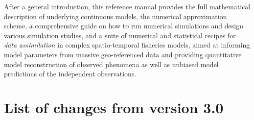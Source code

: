 \documentclass[a4paper,12pt,twoside]{book}
\begin{document}
After a general introduction, this reference manual provides the full mathematical description of underlying continuous models, the numerical approximation scheme, a comprehensive guide on how to run numerical simulations and design various simulation studies, and a suite of numerical and statistical recipes for \textit{data assimilation} in complex spatio-temporal fisheries models, aimed at informing model parameters from massive geo-referenced data and providing quantitative model reconstruction of observed phenomena as well as unbiased model predictions of the independent observations.

\clearpage

\chapter*{List of changes from version 3.0}
\end{document}
